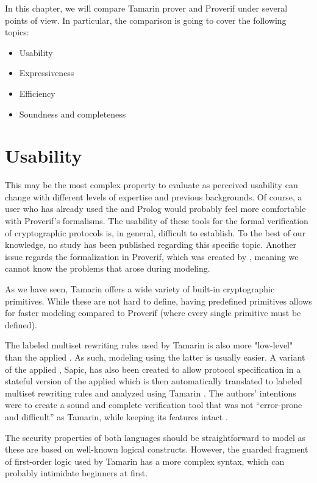 \label{sec:comparison}

In this chapter, we will compare Tamarin prover and Proverif under several points of view.
In particular, the comparison is going to cover the following topics:
\begin{itemize}
    \item Usability
    \item Expressiveness
    \item Efficiency
    \item Soundness and completeness
\end{itemize}

\section{Usability}
This may be the most complex property to evaluate as perceived usability can change with different levels of expertise and previous backgrounds. Of course, a user who has already used the \pic{} and Prolog would probably feel more comfortable with Proverif's formalisms. The usability of these tools for the formal verification of cryptographic protocols is, in general, difficult to establish. To the best of our knowledge, no study has been published regarding this specific topic. Another issue regards the formalization in Proverif, which was created by \MMNV{}, meaning we cannot know the problems that arose during modeling.

As we have seen, Tamarin offers a wide variety of built-in cryptographic primitives. While these are not hard to define, having predefined primitives allows for faster modeling compared to Proverif (where every single primitive must be defined).

The labeled multiset rewriting rules used by Tamarin is also more "low-level" than the applied \pic{}. As such, modeling using the latter is usually easier. A variant of the applied \pic{}, Sapic, has also been created to allow protocol specification in a stateful version of the applied \pic{} which is then automatically translated to labeled multiset rewriting rules and analyzed using Tamarin \cite{kremer:hal-00955869}. The authors' intentions were to create a sound and complete verification tool that was not ``error-prone and difficult'' as Tamarin, while keeping its features intact \cite{sapic-website}.

The security properties of both languages should be straightforward to model as these are based on well-known logical constructs. However, the guarded fragment of first-order logic used by Tamarin has a more complex syntax, which can probably intimidate beginners at first.

